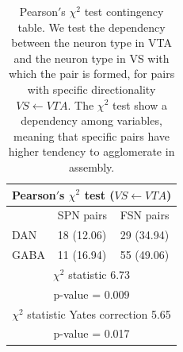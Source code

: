 \begin{table}[H]
\begin{tabular}{ |p{3cm}|p{3cm}|p{3cm}| }
 \hline
 \multicolumn{3}{|c|}{Pearson$'$s $\chi^2$ test ($VS \leftarrow VTA$)} \\
 \hline
 & SPN pairs & FSN pairs\\
 \hline
 DAN & 18 (12.06) & 29 (34.94) \\
 \hline
 GABA & 11 (16.94) & 55 (49.06)\\
 \hline
 \multicolumn{3}{|c|}{$\chi^2$ statistic  6.73}\\
 \multicolumn{3}{|c|}{p-value = 0.009}\\
 \hline
 \multicolumn{3}{|c|}{$\chi^2$ statistic Yates correction 5.65}\\
 \multicolumn{3}{|c|}{p-value = 0.017}\\
 \hline
\end{tabular}
\caption{Pearson$'$s $\chi^{2}$ test contingency table. We test the dependency between the neuron type in VTA and the neuron type in VS with which the pair is formed, for pairs with specific directionality $VS \leftarrow VTA$. The $\chi^2$ test show a dependency among variables, meaning that specific pairs have higher tendency to agglomerate in assembly.}
\label{tab:chisquare_vtavs}
\end{table}
